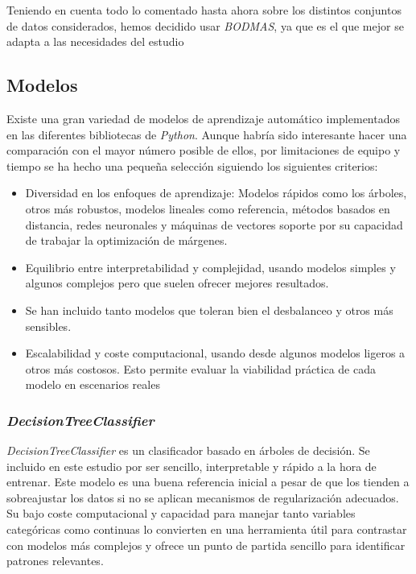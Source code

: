 \vspace{1em}

Teniendo en cuenta todo lo comentado hasta ahora sobre los distintos conjuntos de datos considerados, hemos decidido usar \textit{BODMAS}, ya que es el que mejor se adapta a las necesidades del estudio

\subsection{Modelos}
\label{subsec:select_model}

Existe una gran variedad de modelos de aprendizaje automático implementados en las diferentes bibliotecas de \textit{Python}. Aunque habría sido interesante hacer una comparación con el mayor número posible de ellos, por limitaciones de equipo y tiempo se ha hecho una pequeña selección siguiendo los siguientes criterios:

\begin{itemize}
	\item Diversidad en los enfoques de aprendizaje: Modelos rápidos como los árboles, otros más robustos, modelos lineales como referencia, métodos basados en distancia, redes neuronales y máquinas de vectores soporte por su capacidad de trabajar la optimización de márgenes.
	\item Equilibrio entre interpretabilidad y complejidad, usando modelos simples y algunos complejos pero que suelen ofrecer mejores resultados.
	\item Se han incluido tanto modelos que toleran bien el desbalanceo y otros más sensibles.
	\item Escalabilidad y coste computacional, usando desde algunos modelos ligeros a otros más costosos. Esto permite evaluar la viabilidad práctica de cada modelo en escenarios reales
\end{itemize}

\subsubsection{\textit{DecisionTreeClassifier}}
\label{subsubsec:decisiontreeclassifier}

\textit{DecisionTreeClassifier} es un clasificador basado en árboles de decisión. Se incluido en este estudio por ser sencillo, interpretable y rápido a la hora de entrenar. Este modelo es una buena referencia inicial a pesar de que los tienden a sobreajustar los datos si no se aplican mecanismos de regularización adecuados. Su bajo coste computacional y capacidad para manejar tanto variables categóricas como continuas lo convierten en una herramienta útil para contrastar con modelos más complejos y ofrece un punto de partida sencillo para identificar patrones relevantes.


